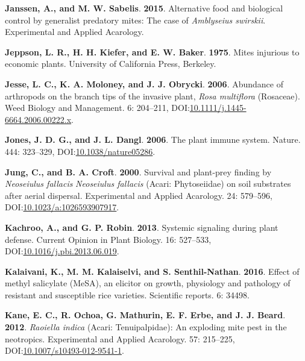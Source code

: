\documentclass[12pt,final,CPage]{ufthesis}
\newlength{\cslhangindent}
\newenvironment{CSLReferences}[2] %
{%
	\setlength{\parindent}{0pt}
	\ifodd #1 \everypar{\setlength{\hangindent}{\cslhangindent}}\ignorespaces\fi
	\ifnum #2 > 0
	\setlength{\parskip}{#2\baselineskip}
	\fi
}%
{}
\begin{document}
{\begin{CSLReferences}{1}{0}
  \leavevmode{}%
  \textbf{Janssen, A., and M. W. Sabelis}. \textbf{2015}. Alternative food and biological control by generalist predatory mites: The case of {\emph{Amblyseius swirskii}}. Experimental and Applied Acarology.

  \leavevmode{}%
  \textbf{Jeppson, L. R., H. H. Kiefer, and E. W. Baker}. \textbf{1975}. Mites injurious to economic plants. University of California Press, Berkeley.

  \leavevmode{}%
  \textbf{Jesse, L. C., K. A. Moloney, and J. J. Obrycki}. \textbf{2006}. Abundance of arthropods on the branch tips of the invasive plant, {\emph{Rosa multiflora}} ({Rosaceae}). Weed Biology and Management. 6: 204--211, DOI:\href{https://doi.org/10.1111/j.1445-6664.2006.00222.x}{10.1111/j.1445-6664.2006.00222.x}.

  \leavevmode{}%
  \textbf{Jones, J. D. G., and J. L. Dangl}. \textbf{2006}. The plant immune system. Nature. 444: 323--329, DOI:\href{https://doi.org/10.1038/nature05286}{10.1038/nature05286}.

  \leavevmode{}%
  \textbf{Jung, C., and B. A. Croft}. \textbf{2000}. Survival and plant-prey finding by {\emph{Neoseiulus fallacis}} {\emph{Neoseiulus fallacis}} ({Acari}: {Phytoseiidae}) on soil substrates after aerial dispersal. Experimental and Applied Acarology. 24: 579--596, DOI:\href{https://doi.org/10.1023/a:1026593907917}{10.1023/a:1026593907917}.

  \leavevmode{}%
  \textbf{Kachroo, A., and G. P. Robin}. \textbf{2013}. Systemic signaling during plant defense. Current Opinion in Plant Biology. 16: 527--533, DOI:\href{https://doi.org/10.1016/j.pbi.2013.06.019}{10.1016/j.pbi.2013.06.019}.

  \leavevmode{}%
  \textbf{Kalaivani, K., M. M. Kalaiselvi, and S. Senthil-Nathan}. \textbf{2016}. Effect of methyl salicylate {(MeSA)}, an elicitor on growth, physiology and pathology of resistant and susceptible rice varieties. Scientific reports. 6: 34498.

  \leavevmode{}%
  \textbf{Kane, E. C., R. Ochoa, G. Mathurin, E. F. Erbe, and J. J. Beard}. \textbf{2012}. {\emph{Raoiella indica}} ({Acari}: {Tenuipalpidae}): An exploding mite pest in the neotropics. Experimental and Applied Acarology. 57: 215--225, DOI:\href{https://doi.org/10.1007/s10493-012-9541-1}{10.1007/s10493-012-9541-1}.


\end{CSLReferences}}
\end{document}

